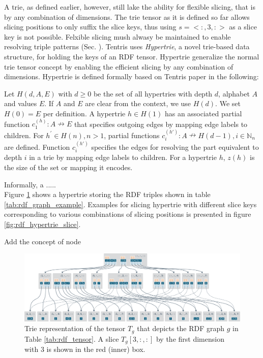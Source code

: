A trie, as defined earlier, however, still lake the ability for flexible slicing, that is by any combination of dimensions. The trie tensor as it is defined so far allows slicing positions to only suffix the slice keys, thus using $s = <:, 3, :>$ as a slice key is not possible. Felxible slicing mush alwasy be maintained to enable resolving triple patterns (Sec. ). Tentris uses \textit{Hypertrie}, a novel trie-based data structure, for holding the keys of an RDF tensor. Hypertrie generalize the normal trie tensor concept by enabling the efficient slicing by any combination of dimensions. Hypertrie is defined formally based on Tentris paper \cite{tentris2020} in the following:\\

\begin{definition}
	\label{def:bht}
	Let $H(d, A, E)$ with $d \geq 0$ be the set of all hypertries with depth $d$, alphabet $A$ and values $E$.
	If $A$ and $E$ are clear from the context, we use $H(d)$.
	We set $H(0) = E$ per definition. 
	A hypertrie $h\in H(1)$ has an associated partial function $c^{(h)}_1: A\nrightarrow E$ that specifies outgoing edges by mapping edge labels to children.
	For $ h^{'} \in H(n), n>1 $, partial functions $c^{(h')}_i: A \nrightarrow H(d-1), i \in \mathbb{N}_{n}$ are defined.
	Function $c^{(h')}_i$ specifies the edges for resolving the part equivalent to depth $i$ in a trie by mapping edge labels to children.
	For a hypertrie $h$, $z(h)$ is the size of the set or mapping it encodes.
\end{definition}

 Informally, a ..... \\

Figure \ref{fig:rdf_hypertrie} shows a hypertrie storing the RDF triples shown in table \ref{tab:rdf_graph_example}. Examples for slicing hypertrie with different slice keys corresponding to various combinations of slicing positions is presented in figure \ref{fig:rdf_hypertrie_slice}. \\


Add the concept of node 
\clearpage

\begin{figure}
		\centering
		\includegraphics[scale=0.78]{figures/chapter2/hypertrie4}
		\caption{Trie representation of the tensor $T_g$ that depicts the RDF graph $g$ in  Table \ref{tab:rdf_tensor}. A slice $T_g[3, :, :]$ by the first dimension with 3 is shown in the red (inner) box.}
		\label{fig:rdf_hypertrie}
\end{figure}

